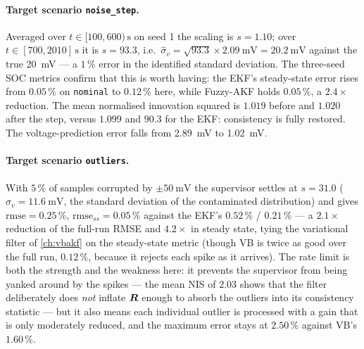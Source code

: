 \paragraph{Target scenario \texttt{noise\_step}.}  Averaged over $t\in[100,600)\,\si{\second}$ on
seed 1 the scaling is $s=1.10$; over $t\in[700,2010]\,\si{\second}$ it is $s=93.3$, i.e.\
$\hat\sigma_v=\sqrt{93.3}\times\SI{2.09}{\milli\volt}=\SI{20.2}{\milli\volt}$ against the true
\SI{20}{\milli\volt} --- a $1\,\%$ error in the identified standard deviation.  The three-seed SOC
metrics confirm that this is worth having: the EKF's steady-state error rises from $0.05\,\%$ on
\texttt{nominal} to $0.12\,\%$ here, while Fuzzy-AKF holds $\mathbf{0.05\,\%}$, a $2.4\times$
reduction.  The mean normalised innovation squared is $1.019$ before and $1.020$ after the step,
versus $1.099$ and $\mathbf{90.3}$ for the EKF: consistency is fully restored.  The
voltage-prediction error falls from \SI{2.89}{\milli\volt} to \SI{1.02}{\milli\volt}.

\paragraph{Target scenario \texttt{outliers}.}  With $5\,\%$ of samples corrupted by
$\pm\SI{50}{\milli\volt}$ the supervisor settles at $s=31.0$
($\hat\sigma_v=\SI{11.6}{\milli\volt}$, the standard deviation of the contaminated distribution) and
gives $\mathrm{rmse}=0.25\,\%$, $\mathrm{rmse}_{ss}=\mathbf{0.05\,\%}$ against the EKF's $0.52\,\%$ /
$0.21\,\%$ --- a $2.1\times$ reduction of the full-run RMSE and $4.2\times$ in steady state, tying
the variational filter of \cref{ch:vbakf} on the steady-state metric (though VB is twice as good over
the full run, $0.12\,\%$, because it rejects each spike as it arrives).  The rate limit is both the
strength and the weakness here: it prevents the supervisor from being yanked around by the spikes ---
the mean NIS of $2.03$ shows that the filter deliberately does \emph{not} inflate $\bm{R}$ enough to
absorb the outliers into its consistency statistic --- but it also means each individual outlier is
processed with a gain that is only moderately reduced, and the maximum error stays at $2.50\,\%$
against VB's $1.60\,\%$.

